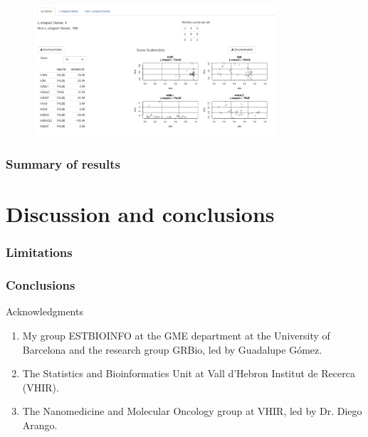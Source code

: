 \documentclass[handout]{beamer}
\begin{document}
{\begin{center}
	\begin{figure}[h]          
		\includegraphics[width=0.8\textwidth]{images/shinyApp3.png}
	\end{figure}
\end{center}
}

\begin{frame}
\frametitle{Summary of results}
\end{frame}


\section{Discussion and conclusions}

\begin{frame}
	\frametitle{Limitations}
\end{frame}

\begin{frame}
	\frametitle{Conclusions}
\end{frame}



\begin{frame}{Acknowledgments}
	\begin{enumerate}
		\item My group ESTBIOINFO at the GME department at the University of Barcelona and the research group GRBio, led by Guadalupe Gómez.
		\item The Statistics and Bioinformatics Unit at Vall d'Hebron Institut de Recerca (VHIR).
		\item The Nanomedicine and Molecular Oncology group at VHIR, led by Dr. Diego Arango.
	\end{enumerate}
\end{frame}
\end{document}

